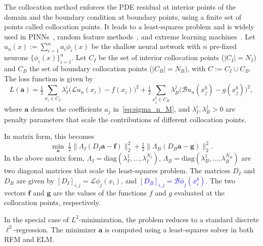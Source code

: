 \documentclass{article}
\theoremstyle{remark}
\newtheorem{remark}{Remark}
\begin{document}
The collocation method enforces the PDE residual at interior points of the domain and the boundary condition at boundary points, using a finite set of points called collocation points.
It leads to a least-squares problem and is widely used in PINNs~\cite{RPK:2019}, random feature methods~\cite{CCEY:2022}, and extreme learning machines~\cite{HZS:2006,wang2024extreme}.
Let $u_n(x) := \sum_{i = 1}^n a_i \phi_i(x)$ be the shallow neural network with $n$ pre-fixed neurons $\{ \phi_i(x)\}_{i = 1}^n$. 
Let $C_I$ be the set of interior collocation points ($|C_I|=N_I$) 
and $C_B$ the set of boundary collocation points ($|C_B|=N_B$), 
with $C := C_I \cup C_B$. 
The loss function is given by
\begin{equation}\label{loss}
    L(\mathbf{a})= \tfrac{1}{2} \sum_{x_i \in C_I} \lambda_I^i \bigl( \mathcal{L} u_n(x_i) - f(x_i) \bigr)^2 
    +  \tfrac{1}{2} \sum_{x_j^b \in C_B} \lambda_B^j  \bigl( \mathcal{B} u_n(x_j^b) - g(x_j^b) \bigr)^2,
\end{equation}
where $\mathbf{a}$ denotes the coefficients $a_{j}$ in~\eqref{eq:sigma_n_M}, 
and $\lambda_I^i, \lambda_B^j>0$ are penalty parameters that scale the contributions 
of different collocation points. 

In matrix form, this becomes
\begin{equation}\label{loss-matrix}
    \min_{\mathbf{a}} \; \tfrac{1}{2}\|\Lambda_I(D_I \mathbf{a} - \mathbf{f}) \|_2^2 
    + \tfrac{1}{2}\| \Lambda_B (D_B \mathbf{a}- \mathbf{g} ) \|_2^2. 
\end{equation}
In the above matrix form, $\Lambda_I = \text{diag}(\lambda_I^1,...,\lambda_I^{N_I})$, $\Lambda_B = \text{diag}(\lambda_B^1,...,\lambda_B^{N_B})$ are two diagonal matrices that scale the least-squares problem. 
The matrices $D_I$ and $D_B$ are given by $[D_I]_{i,j} = \mathcal{L}\phi_{j}(x_i) $, and \textcolor{blue}{$[D_B]_{i,j} = \mathcal{B}\phi_{j}(x^b_i)$}. 
The two vectors $\mathbf{f}$ and $\mathbf{g}$ are the values of the functions $f$ and $g$ evaluated at the collocation points, respectively.

In the special case of $L^2$-minimization, the problem reduces to a standard discrete $\ell^2$-regression.
The minimizer $\mathbf{a}$ is computed using a least-squares solver in both RFM and ELM.

\end{document}
